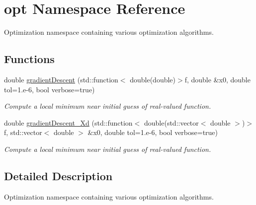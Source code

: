 \hypertarget{namespaceopt}{}\section{opt Namespace Reference}
\label{namespaceopt}


Optimization namespace containing various optimization algorithms.  


\subsection*{Functions}
\begin{DoxyCompactItemize}
\item 
double \mbox{\hyperlink{namespaceopt_af1ef2e32062af31429ae74fc07c57fb0}{gradient\+Descent}} (std\+::function$<$ double(double)$>$f, double \&x0, double tol=1.e-\/6, bool verbose=true)
\begin{DoxyCompactList}\small\item\em Compute a local minimum near initial guess of real-\/valued function. \end{DoxyCompactList}\item 
double \mbox{\hyperlink{namespaceopt_a7db27c86e1c5a503b7f8373ba067d97b}{gradient\+Descent\+\_\+\+Xd}} (std\+::function$<$ double(std\+::vector$<$ double $>$)$>$f, std\+::vector$<$ double $>$ \&x0, double tol=1.e-\/6, bool verbose=true)
\begin{DoxyCompactList}\small\item\em Compute a local minimum near initial guess of real-\/valued function. \end{DoxyCompactList}\end{DoxyCompactItemize}


\subsection{Detailed Description}
Optimization namespace containing various optimization algorithms. 

